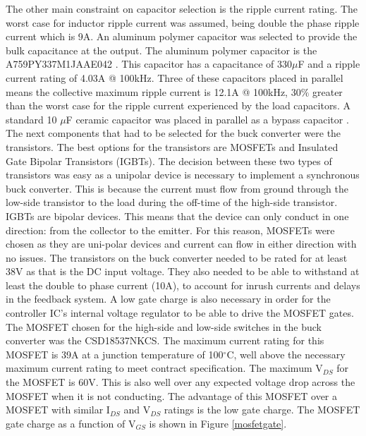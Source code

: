 \documentclass[11pt]{article}
\begin{document}
    \noindent The other main constraint on capacitor selection is the ripple current rating. The worst case for inductor ripple current was assumed, being double the phase ripple current which is 9A. An aluminum polymer capacitor was selected to provide the bulk capacitance at the output. The aluminum polymer capacitor is the A759PY337M1JAAE042 \cite{kemet_charged_single-ended_2017}. This capacitor has a capacitance of 330$\mu$F and a ripple current rating of 4.03A @ 100kHz. Three of these capacitors placed in parallel means the collective maximum ripple current is 12.1A @ 100kHz, 30$\%$ greater than the worst case for the ripple current experienced by the load capacitors. A standard 10 $\mu$F ceramic capacitor was placed in parallel as a bypass capacitor \cite{kemet_charged_single-ended_2017}.
    \newline
    \newline
    \noindent The next components that had to be selected for the buck converter were the transistors. The best options for the transistors are MOSFETs and Insulated Gate Bipolar Transistors (IGBTs). The decision between these two types of transistors was easy as a unipolar device is necessary to implement a synchronous buck converter. This is because the current must flow from ground through the low-side transistor to the load during the off-time of the high-side transistor. IGBTs are bipolar devices. This means that the device can only conduct in one direction: from the collector to the emitter. For this reason, MOSFETs were chosen as they are uni-polar devices and current can flow in either direction with no issues.
    \newline
    \newline
    \noindent The transistors on the buck converter needed to be rated for at least 38V as that is the DC input voltage. They also needed to be able to withstand at least the double to phase current (10A), to account for inrush currents and delays in the feedback system. A low gate charge is also necessary in order for the controller IC's internal voltage regulator to be able to drive the MOSFET gates. The MOSFET chosen for the high-side and low-side switches in the buck converter was the CSD18537NKCS. The maximum current rating for this MOSFET is 39A at a junction temperature of 100$^{\circ}$C, well above the necessary maximum current rating to meet contract specification. The maximum V$_{DS}$ for the MOSFET is 60V. This is also well over any expected voltage drop across the MOSFET when it is not conducting. The advantage of this MOSFET over a MOSFET with similar I$_{DS}$ and V$_{DS}$ ratings is the low gate charge. The MOSFET gate charge as a function of V$_{GS}$ is shown in Figure \ref{mosfetgate}.
    
\end{document}
